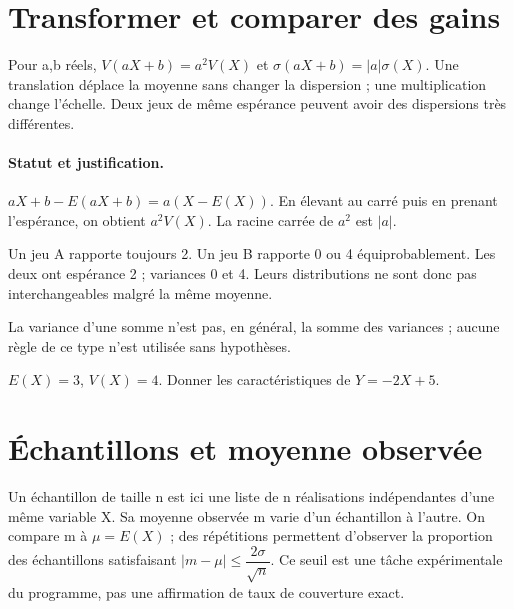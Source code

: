 \section{Transformer et comparer des gains}\label{C08-U4}
\begin{keypoint}
Pour a,b réels, $V(aX+b)=a^2V(X)$ et $\sigma(aX+b)=|a|\sigma(X)$. Une translation déplace la moyenne sans changer la dispersion ; une multiplication change l’échelle. Deux jeux de même espérance peuvent avoir des dispersions très différentes.
\end{keypoint}
\paragraph{Statut et justification.} $aX+b-E(aX+b)=a(X-E(X))$. En élevant au carré puis en prenant l’espérance, on obtient $a^2V(X)$. La racine carrée de $a^2$ est $|a|$.
\begin{example}Un jeu A rapporte toujours 2. Un jeu B rapporte 0 ou 4 équiprobablement. Les deux ont espérance 2 ; variances 0 et 4. Leurs distributions ne sont donc pas interchangeables malgré la même moyenne.\end{example}\label{C08-EX4}
\begin{pitfall}La variance d’une somme n’est pas, en général, la somme des variances ; aucune règle de ce type n’est utilisée sans hypothèses.\end{pitfall}
\begin{application}$E(X)=3$, $V(X)=4$. Donner les caractéristiques de $Y=-2X+5$.\end{application}\label{C08-AP4}
\section{Échantillons et moyenne observée}\label{C08-U5}
\begin{keypoint}
Un échantillon de taille n est ici une liste de n réalisations indépendantes d’une même variable X. Sa moyenne observée m varie d’un échantillon à l’autre. On compare m à $\mu=E(X)$ ; des répétitions permettent d’observer la proportion des échantillons satisfaisant $|m-\mu|\leq \dfrac{2\sigma}{\sqrt n}$. Ce seuil est une tâche expérimentale du programme, pas une affirmation de taux de couverture exact.
\end{keypoint}
